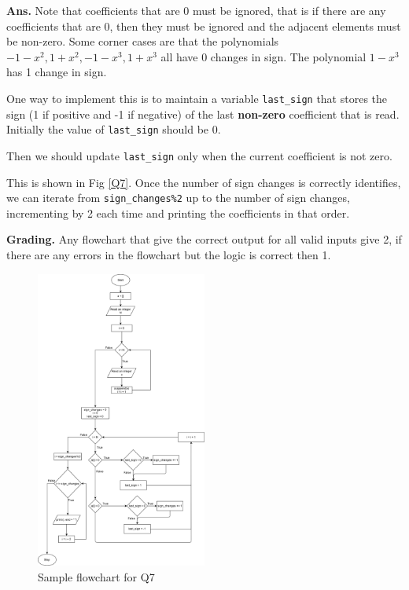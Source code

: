 \documentclass{article}
\begin{document}
    \begin{flushleft}
    
    \textbf{Ans. } Note that coefficients that are $0$ must be ignored, that is if there are any 
    coefficients that are 0, then they must be ignored and the adjacent elements must be non-zero.
    Some corner cases are that the polynomials $-1-x^2, 1+x^2, -1-x^3, 1+x^3$ all have 0 changes in sign.
    The polynomial $1-x^3$ has 1 change in sign.

    One way to implement this is to maintain a variable \lstinline{last_sign} that stores the sign (1 if 
    positive and -1 if negative) of the last \textbf{non-zero} coefficient that is read.
    Initially the value of \lstinline{last_sign} should be 0.

    Then we should update \lstinline{last_sign} only when the current coefficient is not zero.

    This is shown in Fig \ref{Q7}.
    Once the number of sign changes is correctly identifies, we can iterate from \lstinline{sign_changes%2} 
    up to the number of sign changes, incrementing by 2 each time and printing the coefficients in that order.
    
    \end{flushleft}
    
    \begin{flushleft}
    
    \textbf{Grading. } Any flowchart that give the correct output for all valid inputs give 2, if there are any 
    errors in the flowchart but the logic is correct then 1.
    
    \end{flushleft}
    
    \begin{figure}[ht]
        \centering
        \includegraphics[width=0.5\textwidth]{Q7.png}
        \caption{Sample flowchart for Q7}
        \label{Q}
    \end{figure}
    
\end{document}
